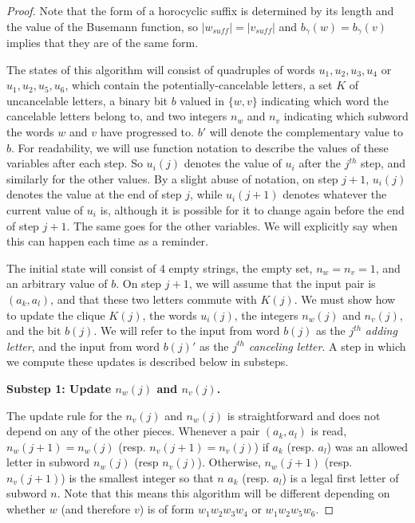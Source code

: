 \documentclass[10pt,a4paper]{amsart}
\theoremstyle{definition}
\theoremstyle{remark}
\begin{document}
	\begin{proof}
		Note that the form of a horocyclic suffix is determined by its length and the value of the Busemann function, so $|w_{suff}|=|v_{suff}|$ and $b_\gamma(w)=b_\gamma(v)$ implies that they are of the same form.
		
		The states of this algorithm will consist of quadruples of words $u_1, u_2, u_3, u_4$ or $u_1, u_2, u_5, u_6$, which contain the potentially-cancelable letters, a set $K$ of uncancelable letters, a binary bit $b$ valued in $\{w, v\}$ indicating which word the cancelable letters belong to, and two integers $n_w$ and $n_v$ indicating which subword the words $w$ and $v$ have progressed to. $b'$ will denote the complementary value to $b$. For readability, we will use function notation to describe the values of these variables after each step. So $u_i(j)$ denotes the value of $u_i$ after the $j^{th}$ step, and similarly for the other values. By a slight abuse of notation, on step $j+1$, $u_i(j)$ denotes the value at the end of step $j$, while $u_i(j+1)$ denotes whatever the current value of $u_i$ is, although it is possible for it to change again before the end of step $j+1$. The same goes for the other variables. We will explicitly say when this can happen each time as a reminder.
		
		The initial state will consist of 4 empty strings, the empty set, $n_w=n_v=1$, and an arbitrary value of $b$. On step $j+1$, we will assume that the input pair is $(a_k, a_l)$, and that these two letters commute with $K(j)$. We must show how to update the clique $K(j)$, the words $u_i(j)$, the integers $n_{w}(j)$ and $n_v(j)$, and the bit $b(j)$. We will refer to the input from word $b(j)$ as the $j^{th}$\textit{ adding letter}, and the input from word $b(j)'$ as the $j^{th}$ \textit{canceling letter}. A step in which we compute these updates is described below in substeps.
		
		\textbf{Substep 1: Update $n_w(j)$ and $n_v(j)$.}
		
		The update rule for the $n_v(j)$ and $n_w(j)$ is straightforward and does not depend on any of the other pieces. Whenever a pair $(a_k, a_l)$ is read, $n_w(j+1)=n_w(j)$ (resp. $n_v(j+1)=n_v(j)$) if $a_k$ (resp. $a_l$) was an allowed letter in subword $n_w(j)$ (resp $n_v(j)$). Otherwise, $n_w(j+1)$ (resp. $n_v(j+1)$) is the smallest integer so that $n$ $a_k$ (resp. $a_l$) is a legal first letter of subword $n$. Note that this means this algorithm will be different depending on whether $w$ (and therefore $v$) is of form $w_1w_2w_3w_4$ or $w_1w_2w_5w_6$.
		

\end{proof}
\end{document}

